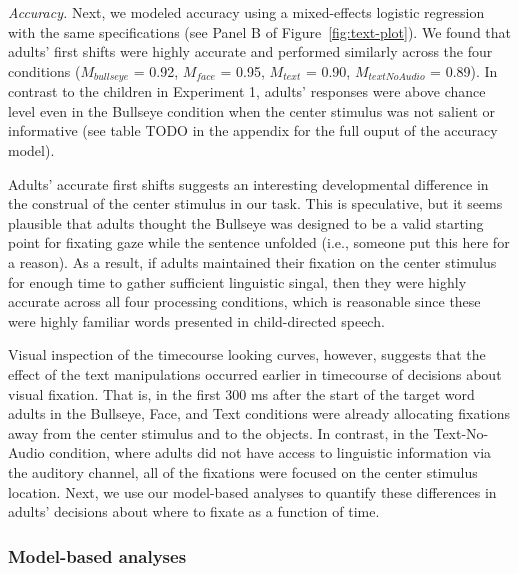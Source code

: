 \documentclass[english,floatsintext,man]{apa6}
\begin{document}
\emph{Accuracy.} Next, we modeled accuracy using a mixed-effects
logistic regression with the same specifications (see Panel B of
Figure~\ref{fig:text-plot}). We found that adults' first shifts were
highly accurate and performed similarly across the four conditions
(\(M_{bullseye}\) = 0.92, \(M_{face}\) = 0.95, \(M_{text}\) = 0.90,
\(M_{textNoAudio}\) = 0.89). In contrast to the children in Experiment
1, adults' responses were above chance level even in the Bullseye
condition when the center stimulus was not salient or informative (see
table TODO in the appendix for the full ouput of the accuracy model).

Adults' accurate first shifts suggests an interesting developmental
difference in the construal of the center stimulus in our task. This is
speculative, but it seems plausible that adults thought the Bullseye was
designed to be a valid starting point for fixating gaze while the
sentence unfolded (i.e., someone put this here for a reason). As a
result, if adults maintained their fixation on the center stimulus for
enough time to gather sufficient linguistic singal, then they were
highly accurate across all four processing conditions, which is
reasonable since these were highly familiar words presented in
child-directed speech.

Visual inspection of the timecourse looking curves, however, suggests
that the effect of the text manipulations occurred earlier in timecourse
of decisions about visual fixation. That is, in the first 300 ms after
the start of the target word adults in the Bullseye, Face, and Text
conditions were already allocating fixations away from the center
stimulus and to the objects. In contrast, in the Text-No-Audio
condition, where adults did not have access to linguistic information
via the auditory channel, all of the fixations were focused on the
center stimulus location. Next, we use our model-based analyses to
quantify these differences in adults' decisions about where to fixate as
a function of time.

\hypertarget{model-based-analyses-1}{%
\subsubsection{Model-based analyses}\label{model-based-analyses-1}}
\end{document}
